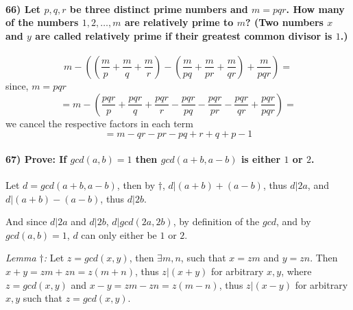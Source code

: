 \documentclass[
]{article}
\begin{document}
\hypertarget{let-pqr-be-three-distinct-prime-numbers-and-m-pqr.-how-many-of-the-numbers-12-dots-m-are-relatively-prime-to-m-two-numbers-x-and-y-are-called-relatively-prime-if-their-greatest-common-divisor-is-1.}{%
\paragraph{\texorpdfstring{66) Let \(p,q,r\) be three distinct prime
numbers and \(m = pqr\). How many of the numbers \(1,2, \dots, m\) are
relatively prime to \(m\)? (Two numbers \(x\) and \(y\) are called
relatively prime if their greatest common divisor is
\(1\).)}{66) Let p,q,r be three distinct prime numbers and m = pqr. How many of the numbers 1,2, \textbackslash dots, m are relatively prime to m? (Two numbers x and y are called relatively prime if their greatest common divisor is 1.)}}\label{let-pqr-be-three-distinct-prime-numbers-and-m-pqr.-how-many-of-the-numbers-12-dots-m-are-relatively-prime-to-m-two-numbers-x-and-y-are-called-relatively-prime-if-their-greatest-common-divisor-is-1.}}

\[
m - ((\frac{m}{p} + \frac{m}{q} + \frac{m}{r}) - (\frac{m}{pq} + \frac{m}{pr} + \frac{m}{qr}) + \frac{m}{pqr}) = 
\] since, \(m = pqr\) \[
= m - (\frac{pqr}{p} + \frac{pqr}{q} + \frac{pqr}{r} - \frac{pqr}{pq} - \frac{pqr}{pr} - \frac{pqr}{qr} + \frac{pqr}{pqr}) = 
\] we cancel the respective factors in each term \[
= m - qr - pr - pq + r + q + p - 1
\]

\hypertarget{prove-if-gcdab-1-then-gcdaba-b-is-either-1-or-2.}{%
\paragraph{\texorpdfstring{67) Prove: If \(gcd(a,b) = 1\) then
\(gcd(a+b,a-b)\) is either \(1\) or
\(2\).}{67) Prove: If gcd(a,b) = 1 then gcd(a+b,a-b) is either 1 or 2.}}\label{prove-if-gcdab-1-then-gcdaba-b-is-either-1-or-2.}}

Let \(d = gcd(a+b,a-b)\), then by \(\dagger\), \(d | (a+b)+(a-b)\), thus
\(d|2a\), and \(d | (a+b)-(a-b)\), thus \(d | 2b\).

And since \(d|2a\) and \(d |2b\), \(d|gcd(2a,2b)\), by definition of the
\(gcd\), and by \(gcd(a,b) = 1\), \(d\) can only either be \(1\) or
\(2\).

\emph{Lemma \(\dagger\):} Let \(z = gcd(x,y)\), then \(\exists m,n\),
such that \(x=zm\) and \(y=zn\). Then \(x+y = zm + zn = z(m+n)\), thus
\(z|(x+y)\) for arbitrary \(x,y\), where \(z = gcd(x,y)\) and
\(x-y = zm - zn = z(m-n)\), thus \(z|(x-y)\) for arbitrary \(x,y\) such
that \(z=gcd(x,y)\).
\end{document}
